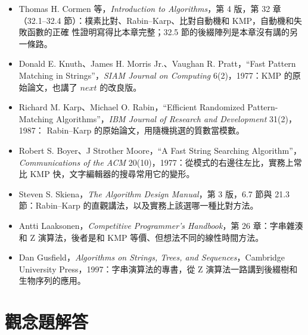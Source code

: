 \begin{itemize}
\item Thomas H. Cormen 等，\textit{Introduction to Algorithms}，第 4 版，第 32 章
（32.1--32.4 節）：樸素比對、Rabin--Karp、比對自動機和 KMP，自動機和失敗函數的正確
性證明寫得比本章完整；32.5 節的後綴陣列是本章沒有講的另一條路。
\item Donald E. Knuth、James H. Morris Jr.、Vaughan R. Pratt，``Fast Pattern Matching in
Strings''，\textit{SIAM Journal on Computing} 6(2)，1977：KMP 的原始論文，也講了
$\mathit{next}$ 的改良版。
\item Richard M. Karp、Michael O. Rabin，``Efficient Randomized Pattern-Matching
Algorithms''，\textit{IBM Journal of Research and Development} 31(2)，1987：
Rabin--Karp 的原始論文，用隨機挑選的質數當模數。
\item Robert S. Boyer、J Strother Moore，``A Fast String Searching Algorithm''，
\textit{Communications of the ACM} 20(10)，1977：從模式的右邊往左比，實務上常比 KMP
快，文字編輯器的搜尋常用它的變形。
\item Steven S. Skiena，\textit{The Algorithm Design Manual}，第 3 版，6.7 節與 21.3
節：Rabin--Karp 的直觀講法，以及實務上該選哪一種比對方法。
\item Antti Laaksonen，\textit{Competitive Programmer's Handbook}，第 26 章：字串雜湊
和 Z 演算法，後者是和 KMP 等價、但想法不同的線性時間方法。
\item Dan Gusfield，\textit{Algorithms on Strings, Trees, and Sequences}，Cambridge
University Press，1997：字串演算法的專書，從 Z 演算法一路講到後綴樹和生物序列的應用。
\end{itemize}

\section*{觀念題解答}

